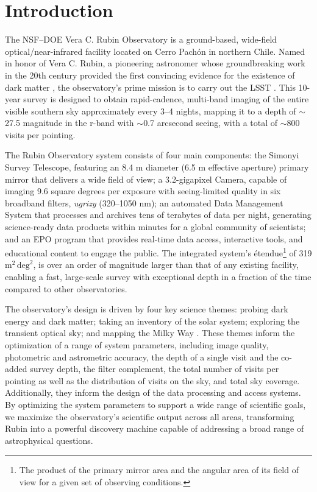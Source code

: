 \section{Introduction
\label{sec:intro}}
The \gls{NSF}–\gls{DOE} Vera C. Rubin Observatory is a ground-based, wide-field optical/near-infrared facility located on Cerro Pach\'on in northern Chile.
Named in honor of Vera C. Rubin, a pioneering astronomer whose groundbreaking work in the 20th century provided the first convincing evidence for the existence of dark matter \citep{1970ApJ...159..379R, 1980ApJ...238..471R}, the observatory’s prime mission is to carry out the \gls{LSST} \citep{2019ApJ...873..111I}.
This 10-year survey is designed to obtain rapid-\gls{cadence}, multi-band imaging of the entire visible southern sky approximately every 3–4 nights, mapping it to a depth of $\sim$ 27.5 magnitude in the r-band with $\sim$0.7 arcsecond \gls{seeing}, with a total of $\sim$800 visits per pointing.

The Rubin Observatory system consists of four main components: the \gls{Simonyi Survey Telescope}, featuring an 8.4 m diameter (6.5 m effective aperture) primary mirror that delivers a wide field of view; a 3.2-gigapixel Camera, capable of imaging 9.6 square degrees per exposure with seeing-limited quality in six broadband filters, \textit{ugrizy} (320–1050 nm); an automated \gls{Data Management System} that processes and archives tens of terabytes of data per night, generating science-ready data products within minutes for a global community of scientists; and an \gls{EPO} program that provides real-time data access, interactive tools, and educational content to engage the public.
The integrated system's \'etendue\footnote{The product of the primary mirror area and the angular area of its field of view for a given set of observing conditions.} of 319 $\text{m}^2 \,\text{deg}^2$, is over an order of magnitude larger than that of any existing facility, enabling a fast, large-scale survey with exceptional depth in a fraction of the time compared to other observatories.

The observatory's design is driven by four key science themes: probing dark energy and dark matter; taking an inventory of the solar system; exploring the \gls{transient} optical sky; and mapping the Milky Way \citep{2019ApJ...873..111I}.
These themes inform the optimization of a range of system parameters, including image quality, photometric and astrometric accuracy, the depth of a single visit and the co-added survey depth, the filter complement, the total number of visits per pointing as well as the distribution of visits on the sky, and  total sky coverage.
Additionally, they inform the design of the data processing and access systems.
By optimizing the system parameters to support a wide range of scientific goals, we maximize the observatory's scientific output across all areas, transforming Rubin into a powerful discovery machine capable of addressing a broad range of astrophysical questions.

